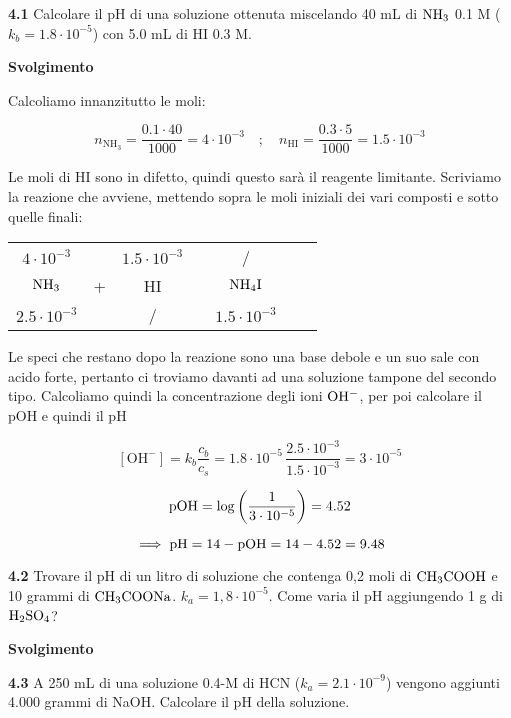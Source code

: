 \textbf{4.1} Calcolare il pH di una soluzione ottenuta miscelando 40 mL di $\rm NH_3$ 0.1 M ($k_b = 1.8 \cdot 10^{-5}$) con 5.0 mL di HI 0.3 M.

\vspace{0.2cm}\large\textbf{Svolgimento}\normalsize

\vspace{0.2cm}Calcoliamo innanzitutto le moli:

$$n_{\text{NH}_3}=\frac{0.1 \cdot 40}{1000}=4 \cdot 10^{-3}
\quad ; \quad
n_{\text{HI}}=\frac{0.3 \cdot 5}{1000}=1.5 \cdot 10^{-3}$$

Le moli di HI sono in difetto, quindi questo sarà il reagente limitante. Scriviamo la reazione che avviene, mettendo sopra le moli iniziali dei vari composti e sotto quelle finali:

\begin{center}
    \begin{tabular}{ccccccc}
        $4 \cdot 10^{-3}$ &  & $1.5 \cdot 10^{-3}$ & & /\\
        $\rm NH_3$ & + & HI & \ce{->} & $\rm NH_4I$ \\
        $2.5 \cdot 10^{-3}$ &  &  / & & $1.5 \cdot 10^{-3}$\\
    \end{tabular}
\end{center}

Le speci che restano dopo la reazione sono una base debole e un suo sale con acido forte, pertanto ci troviamo davanti ad una soluzione tampone del secondo tipo. Calcoliamo quindi la concentrazione degli ioni $\rm OH^-$, per poi calcolare il pOH e quindi il pH

$$[\text{OH}^-]=k_b\frac{c_b}{c_s}
=1.8 \cdot 10^{-5}\,\frac{2.5 \cdot 10^{-3}}{1.5 \cdot 10^{-3}}= 3 \cdot 10^{-5}$$

$$\rm pOH=\log\left(\frac{1}{3 \cdot 10^{-5}}\right)=4.52$$

$$\implies \rm pH=14-pOH=14-4.52=9.48$$

\vspace{0.2cm}\textbf{4.2} Trovare il pH di un litro di soluzione che contenga 0,2 moli di $\rm CH_3COOH$ e 10 grammi di $\rm CH_3COONa$. $k_a = 1,8 \cdot 10^{-5}$. Come varia il pH aggiungendo 1 g di $\rm H_2SO_4$?

\vspace{0.2cm}\large\textbf{Svolgimento}\normalsize

\vspace{0.2cm}

\vspace{0.2cm}\textbf{4.3} A 250 mL di una soluzione 0.4-M di HCN ($k_a = 2.1 \cdot 10^{-9}$) vengono aggiunti 4.000 grammi di NaOH. Calcolare il pH della soluzione.

